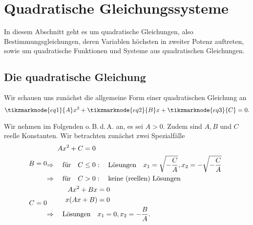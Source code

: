 
\thispagestyle{plain}
\section{Quadratische Gleichungssysteme}

In diesem Abschnitt geht es um quadratische Gleichungen, also Bestimmungsgleichungen, deren Variablen höchsten in zweiter Potenz auftreten, sowie um quadratische Funktionen und Systeme aus quadratischen Gleichungen.

\subsection{Die quadratische Gleichung}

Wir schauen uns zunächst die allgemeine Form einer quadratischen Gleichung an 
\begin{align}
    \tikzmarknode{eq1}{A} x^2 + \tikzmarknode{eq2}{B} x + \tikzmarknode{eq3}{C} =0.
\end{align}

Wir nehmen im Folgenden o.\,B.\,d.\,A. an, es sei $A >0$. Zudem sind $A,B$ und $C$ reelle Konstanten. Wir betrachten zunächst zwei Spezialfälle
\begin{align}
    B &= 0 
    \begin{split}
        A x^2 + C &= 0 \\
        \Rightarrow \qq{für} C &\le 0: \qq{Lösungen} x_1 = \sqrt{-\frac{C}{A}}, x_2 = -\sqrt{-\frac{C}{A}} \\
        \Rightarrow \qq{für} C &>0: \qq{keine (reellen) Lösungen}
    \end{split}\\
    C &= 0 
    \begin{split}
        A x^2 + Bx &= 0 \\
         x(Ax + B) &= 0 \\
        \Rightarrow \qq{Lösungen} &x_1 = 0, x_2 = -\frac{B}{A}.\hspace{3.85cm}
    \end{split}
\end{align}

